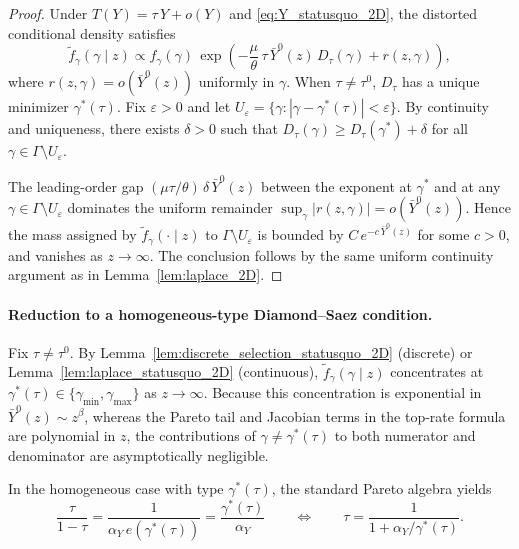 \documentclass[12pt,a4paper]{article}
\theoremstyle{definition}
\theoremstyle{plain}
\theoremstyle{remark}
\begin{document}
\begin{proof}
Under $T(Y) = \tau\,Y + o(Y)$ and \eqref{eq:Y_statusquo_2D}, the distorted conditional density satisfies
\[
  \widetilde{f}_{\gamma}(\gamma \mid z) \propto f_{\gamma}(\gamma)\,\exp\!\left(-\frac{\mu}{\theta}\,\tau\,\bar{Y}^0(z)\,D_{\tau}(\gamma) + r(z,\gamma)\right),
\]
where $r(z,\gamma) = o(\bar{Y}^0(z))$ uniformly in $\gamma$.  When $\tau \neq \tau^0$, $D_{\tau}$ has a unique minimizer $\gamma^*(\tau)$.  Fix $\varepsilon > 0$ and let $U_{\varepsilon} = \{\gamma : |\gamma - \gamma^*(\tau)| < \varepsilon\}$.  By continuity and uniqueness, there exists $\delta > 0$ such that $D_{\tau}(\gamma) \geq D_{\tau}(\gamma^*) + \delta$ for all $\gamma \in \Gamma \setminus U_{\varepsilon}$.

The leading-order gap $(\mu\tau/\theta)\,\delta\,\bar{Y}^0(z)$ between the exponent at $\gamma^*$ and at any $\gamma \in \Gamma \setminus U_{\varepsilon}$ dominates the uniform remainder $\sup_{\gamma}|r(z,\gamma)| = o(\bar{Y}^0(z))$.  Hence the mass assigned by $\widetilde{f}_{\gamma}(\cdot \mid z)$ to $\Gamma \setminus U_{\varepsilon}$ is bounded by $C\,e^{-c\,\bar{Y}^0(z)}$ for some $c > 0$, and vanishes as $z \to \infty$.  The conclusion follows by the same uniform continuity argument as in Lemma~\ref{lem:laplace_2D}.
\end{proof}

\paragraph{Reduction to a homogeneous-type Diamond--Saez condition.}

Fix $\tau \neq \tau^0$.  By Lemma~\ref{lem:discrete_selection_statusquo_2D} (discrete) or Lemma~\ref{lem:laplace_statusquo_2D} (continuous), $\widetilde{f}_{\gamma}(\gamma \mid z)$ concentrates at $\gamma^*(\tau) \in \{\gamma_{\min},\gamma_{\max}\}$ as $z \to \infty$.  Because this concentration is exponential in $\bar{Y}^0(z) \sim z^{\beta}$, whereas the Pareto tail and Jacobian terms in the top-rate formula are polynomial in $z$, the contributions of $\gamma \neq \gamma^*(\tau)$ to both numerator and denominator are asymptotically negligible.

In the homogeneous case with type $\gamma^*(\tau)$, the standard Pareto algebra yields
\begin{equation}
\label{eq:DS_selected_2D}
  \frac{\tau}{1-\tau} = \frac{1}{\alpha_Y\,e(\gamma^*(\tau))} = \frac{\gamma^*(\tau)}{\alpha_Y} \qquad \Longleftrightarrow \qquad \tau = \frac{1}{1+\alpha_Y/\gamma^*(\tau)}.
\end{equation}
\end{document}
